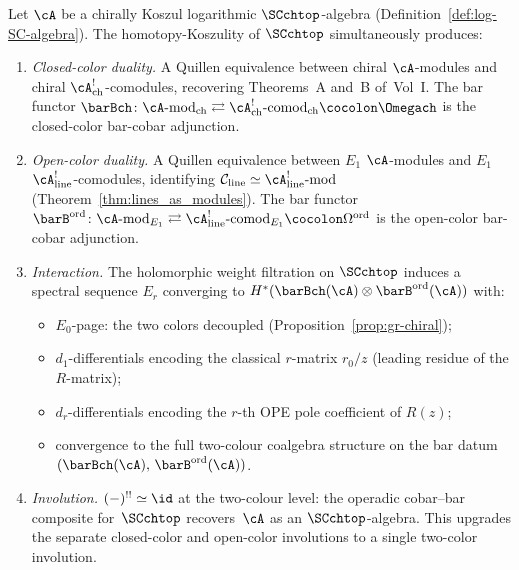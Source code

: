 \begin{theorem}
\label{thm:two-color-master}
Let $\cA$ be a chirally Koszul logarithmic $\SCchtop$-algebra
\textup{(}Definition~\textup{\ref{def:log-SC-algebra})}.
The homotopy-Koszulity of $\SCchtop$
simultaneously produces:
\begin{enumerate}[label=\textup{(\roman*)}]
\item \emph{Closed-color duality.}
 A Quillen equivalence between chiral $\cA$-modules and
 chiral $\cA^!_{\mathrm{ch}}$-comodules, recovering
 Theorems~A and~B of~Vol~I\@. The bar functor
 $\barBch \colon \cA\text{-mod}_{\mathrm{ch}} \rightleftarrows
 \cA^!_{\mathrm{ch}}\text{-comod}_{\mathrm{ch}} \cocolon \Omegach$ is
 the closed-color bar-cobar adjunction.
\item \emph{Open-color duality.}
 A Quillen equivalence between $E_1$ $\cA$-modules and $E_1$
 $\cA^!_{\mathrm{line}}$-comodules, identifying
 $\mathcal{C}_{\mathrm{line}} \simeq \cA^!_{\mathrm{line}}\text{-mod}$
 (Theorem~\ref{thm:lines_as_modules}). The bar functor
 $\barB^{\mathrm{ord}} \colon \cA\text{-mod}_{E_1}
 \rightleftarrows
 \cA^!_{\mathrm{line}}\text{-comod}_{E_1} \cocolon
 \Omega^{\mathrm{ord}}$
 is the open-color bar-cobar adjunction.
\item \emph{Interaction.}
 The holomorphic weight filtration on $\SCchtop$ induces a
 spectral sequence $E_r$ converging to
 $H^\ast(\barBch(\cA) \otimes \barB^{\mathrm{ord}}(\cA))$ with:
 \begin{itemize}
 \item $E_0$-page: the two colors decoupled
 (Proposition~\ref{prop:gr-chiral});
 \item $d_1$-differentials encoding the classical $r$-matrix
 $r_0/z$ (leading residue of the $R$-matrix);
 \item $d_r$-differentials encoding the $r$-th OPE pole
 coefficient of $R(z)$;
 \item convergence to the full two-colour coalgebra structure
 on the bar datum $(\barBch(\cA),\, \barB^{\mathrm{ord}}(\cA))$.
 \end{itemize}
\item \emph{Involution.}
 $(-)^{!!} \simeq \id$ at the two-colour level:
 the operadic cobar--bar composite for~$\SCchtop$
 recovers~$\cA$ as an $\SCchtop$-algebra. This upgrades the separate
 closed-color and open-color involutions to a single
 two-color involution.
\end{enumerate}
\end{theorem}


